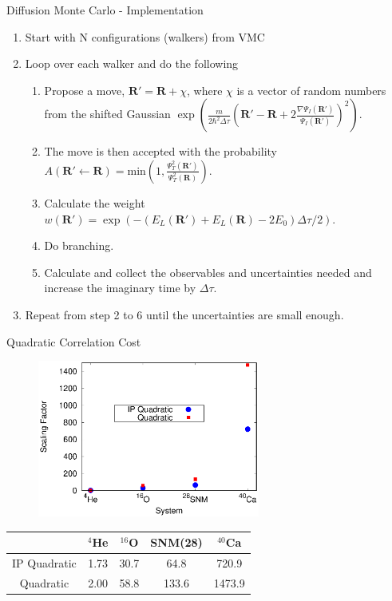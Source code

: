 \documentclass{beamer}
\newcommand{\R}{\mathbf{R}}
\begin{document}
\begin{frame}{Diffusion Monte Carlo - Implementation}
\begin{enumerate}
   \item Start with N configurations (walkers) from VMC
   \item Loop over each walker and do the following
   \begin{enumerate}
      \setlength\itemsep{0.2em}
      \item Propose a move, $\R' = \R + \chi$, where $\chi$ is a vector of random numbers from the shifted Gaussian $\exp\left(\frac{m}{2\hbar^2\Delta\tau}\left(\R'-\R+2\frac{\nabla\Psi_I(\R')}{\Psi_I(\R')}\right)^2\right)$.
      \item The move is then accepted with the probability $A(\R'\leftarrow\R)=\mathrm{min}\left(1,\frac{\Psi_T^2(\R')}{\Psi_T^2(\R)}\right)$.
      \item Calculate the weight $w(\R')=\exp\left(-\left(E_L(\R')+E_L(\R)-2E_0\right)\Delta\tau/2\right)$.
      \item Do branching.
      \item Calculate and collect the observables and uncertainties needed and increase the imaginary time by $\Delta\tau$.
   \end{enumerate}
   \item Repeat from step 2 to 6 until the uncertainties are small enough.
\end{enumerate}
\end{frame}

\begin{frame}{Quadratic Correlation Cost}
\begin{figure}[h]
   \centering
   \includegraphics[width=0.65\textwidth]{scaling.eps}
\end{figure}
\vspace{-0.2cm}
\begin{table}[h!]
   \centering
   \begin{tabular}{ccccc}
      \hline \hline
       & $^{4}$He & $^{16}$O & SNM(28) & $^{40}$Ca \\
      \hline
      IP Quadratic & 1.73 & 30.7 & 64.8 & 720.9 \\
      Quadratic & 2.00 & 58.8 & 133.6 & 1473.9 \\
      \hline \hline
   \end{tabular}
\end{table}
\end{frame}
\end{document}
